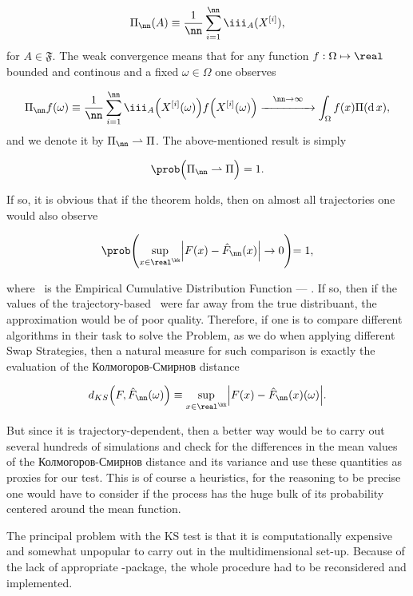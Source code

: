 $$ \Pi_\nn(A) \equiv \frac{1}{\nn}\sum_{i = 1}^\nn \iii_A (X^{[i]}),$$ 
for $A \in \mathfrak{F}$. The weak convergence means that for any function $f: \Omega \mapsto \real$ bounded and continous and a fixed $\omega \in \Omega$ one observes 

$$ \Pi_\nn f (\omega)\equiv \frac{1}{\nn}\sum_{i = 1}^\nn \iii_A \Big(X^{[i]}(\omega)\Big) f\Big(X^{[i]}(\omega)\Big) \overset{\nn\rightarrow \infty}{\xrightarrow{\hspace*{1.5cm}}} \int_\Omega f(x) \Pi( \mathrm{d}\,x ),$$
and we denote it by $\Pi_\nn \rightharpoonup \Pi$. The above-mentioned result is simply

$$ \prob \Big( \Pi_\nn \rightharpoonup \Pi \Big) = 1.$$

If so, it is obvious that if the theorem holds, then on almost all trajectories one would also observe 

\begin{equation*}\label{KS definition}
	\prob\Biggl(\underset{x \in \real^\kk}{\sup}\Big| F(x) - \hat{F}_\nn (x)\Big| \rightarrow 0\Biggl) = 1,
\end{equation*}

where \Fecdf\, is the Empirical Cumulative Distribution Function --- \ecdf. If so, then if the values of the trajectory-based \ecdf\, were far away from the true distribuant, the approximation would be of poor quality. Therefore, if one is to compare different algorithms in their task to solve the Problem, as we do when applying different Swap Strategies, then a natural measure for such comparison is exactly the evaluation of the Колмогоров-Смирнов distance

$$ d_{KS}\Big( F, \hat{F}_\nn (\omega) \Big) \equiv \underset{x \in \real^\kk}{\sup}\Big| F(x) - \hat{F}_\nn (x)(\omega)\Big|.$$

But since it is trajectory-dependent, then a better way would be to carry out several hundreds of simulations and check for the differences in the mean values of the Колмогоров-Смирнов distance and its variance and use these quantities as proxies for our test. This is of course a heuristics, for the reasoning to be precise one would have to consider if the process has the huge bulk of its probability centered around the mean function.  


The principal problem with the KS test is that it is computationally expensive and somewhat unpopular to carry out in the multidimensional set-up. Because of the lack of appropriate \RR-package, the whole procedure had to be reconsidered and implemented. 

